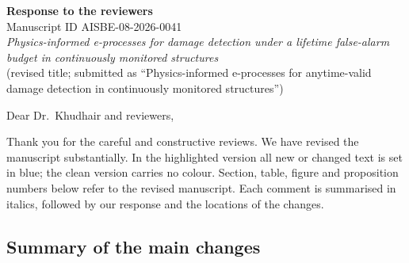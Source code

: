 \documentclass[11pt,a4paper]{article}
\begin{document}
\begin{center}
{\Large\bfseries Response to the reviewers}\\[4pt]
Manuscript ID AISBE-08-2026-0041\\
\emph{Physics-informed e-processes for damage detection under a lifetime false-alarm budget in continuously monitored structures}\\ (revised title; submitted as ``Physics-informed e-processes for anytime-valid damage detection in continuously monitored structures'')
\end{center}

Dear Dr.\ Khudhair and reviewers,

Thank you for the careful and constructive reviews. We have revised the manuscript substantially. In the highlighted version all new or changed text is set in blue; the clean version carries no colour. Section, table, figure and proposition numbers below refer to the revised manuscript. Each comment is summarised in italics, followed by our response and the locations of the changes.

\subsection*{Summary of the main changes}
\end{document}
